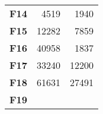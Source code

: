 \documentclass[12pt,a4paper]{article}
\begin{document}
\begin{longtable}[c]{@{}crr@{}}
\begin{minipage}[t]{0.13\columnwidth}
\textbf{F14}
\strut\end{minipage} &
\begin{minipage}[t]{0.09\columnwidth}\raggedleft\strut
4519
\strut\end{minipage} &
\begin{minipage}[t]{0.25\columnwidth}\raggedleft\strut
1940
\strut\end{minipage}\tabularnewline
\begin{minipage}[t]{0.13\columnwidth}\centering\strut
\textbf{F15}
\strut\end{minipage} &
\begin{minipage}[t]{0.09\columnwidth}\raggedleft\strut
12282
\strut\end{minipage} &
\begin{minipage}[t]{0.25\columnwidth}\raggedleft\strut
7859
\strut\end{minipage}\tabularnewline
\begin{minipage}[t]{0.13\columnwidth}\centering\strut
\textbf{F16}
\strut\end{minipage} &
\begin{minipage}[t]{0.09\columnwidth}\raggedleft\strut
40958
\strut\end{minipage} &
\begin{minipage}[t]{0.25\columnwidth}\raggedleft\strut
1837
\strut\end{minipage}\tabularnewline
\begin{minipage}[t]{0.13\columnwidth}\centering\strut
\textbf{F17}
\strut\end{minipage} &
\begin{minipage}[t]{0.09\columnwidth}\raggedleft\strut
33240
\strut\end{minipage} &
\begin{minipage}[t]{0.25\columnwidth}\raggedleft\strut
12200
\strut\end{minipage}\tabularnewline
\begin{minipage}[t]{0.13\columnwidth}\centering\strut
\textbf{F18}
\strut\end{minipage} &
\begin{minipage}[t]{0.09\columnwidth}\raggedleft\strut
61631
\strut\end{minipage} &
\begin{minipage}[t]{0.25\columnwidth}\raggedleft\strut
27491
\strut\end{minipage}\tabularnewline
\begin{minipage}[t]{0.13\columnwidth}\centering\strut
\textbf{F19}
\strut\end{minipage} &

\end{longtable}
\end{document}
